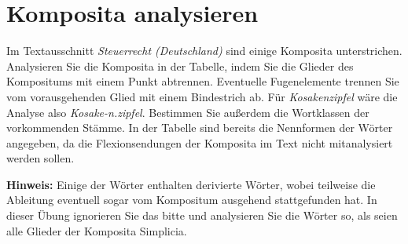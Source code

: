 \section{Komposita analysieren}\label{sec:analyse}

Im Textausschnitt \textit{Steuerrecht (Deutschland)} sind einige Komposita unterstrichen.
Analysieren Sie die Komposita in der Tabelle, indem Sie die Glieder des Kompositums mit einem Punkt abtrennen.
Eventuelle Fugenelemente trennen Sie vom vorausgehenden Glied mit einem Bindestrich ab.
Für \textit{Kosakenzipfel} wäre die Analyse also \textit{Kosake-n.zipfel}.
Bestimmen Sie außerdem die Wortklassen der vorkommenden Stämme.
In der Tabelle sind bereits die Nennformen der Wörter angegeben, da die Flexionsendungen der Komposita im Text nicht mitanalysiert werden sollen.

\Halbzeile

\textbf{Hinweis:} Einige der Wörter enthalten derivierte Wörter, wobei teilweise die Ableitung eventuell sogar vom Kompositum ausgehend stattgefunden hat.
In dieser Übung ignorieren Sie das bitte und analysieren Sie die Wörter so, als seien alle Glieder der Komposita Simplicia.

\Zeile

